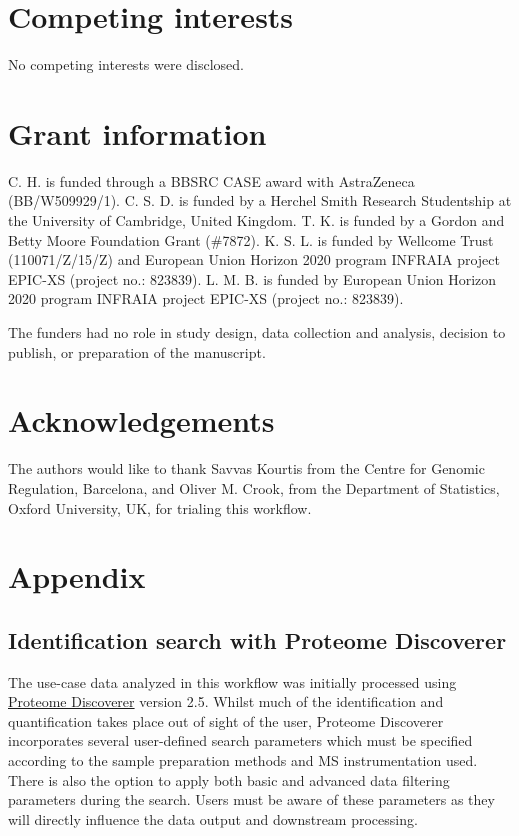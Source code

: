 \documentclass[9pt,a4paper,]{extarticle}
\begin{document}
\hypertarget{competing-interests}{%
\section{Competing interests}\label{competing-interests}}

No competing interests were disclosed.

\hypertarget{grant-information}{%
\section{Grant information}\label{grant-information}}

C. H. is funded through a BBSRC CASE award with AstraZeneca (BB/W509929/1). C. S.
D. is funded by a Herchel Smith Research Studentship at the University of
Cambridge, United Kingdom. T. K. is funded by a Gordon and Betty Moore Foundation
Grant (\#7872). K. S. L. is funded by Wellcome Trust (110071/Z/15/Z) and European
Union Horizon 2020 program INFRAIA project EPIC-XS (project no.: 823839). L. M.
B. is funded by European Union Horizon 2020 program INFRAIA project EPIC-XS
(project no.: 823839).

The funders had no role in study design, data collection and analysis, decision
to publish, or preparation of the manuscript.

\hypertarget{acknowledgements}{%
\section{Acknowledgements}\label{acknowledgements}}

The authors would like to thank Savvas Kourtis from the Centre for Genomic
Regulation, Barcelona, and Oliver M. Crook, from the Department of Statistics,
Oxford University, UK, for trialing this workflow.

\hypertarget{appendix}{%
\section{Appendix}\label{appendix}}

\hypertarget{identification-search-with-proteome-discoverer}{%
\subsection{Identification search with Proteome Discoverer}\label{identification-search-with-proteome-discoverer}}

The use-case data analyzed in this workflow was initially processed using
\href{https://www.thermofisher.com/uk/en/home/industrial/mass-spectrometry/liquid-chromatography-mass-spectrometry-lc-ms/lc-ms-software/multi-omics-data-analysis/proteome-discoverer-software.html}{Proteome Discoverer}
version 2.5. Whilst much of the identification and quantification takes place
out of sight of the user, Proteome Discoverer incorporates several user-defined
search parameters which must be specified according to the sample preparation
methods and MS instrumentation used. There is also the option to apply both
basic and advanced data filtering parameters during the search. Users must be
aware of these parameters as they will directly influence the data output and
downstream processing.
\end{document}
